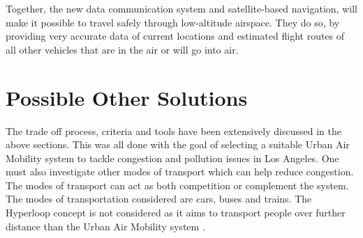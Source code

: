 Together, the new data communication system and satellite-based navigation, will make it possible to travel safely through low-altitude airspace. They do so, by providing very accurate data of current locations and estimated flight routes of all other vehicles that are in the air or will go into air. 

\section{Possible Other Solutions}
\label{comparisonmodesoftransport}
The trade off process, criteria and tools have been extensively discussed in the above sections. This was all done with the goal of selecting a suitable Urban Air Mobility system to tackle congestion and pollution issues in Los Angeles. One must also investigate other modes of transport which can help reduce congestion. The modes of transport can act as both competition or complement the system. The modes of transportation considered are cars, buses and trains. The Hyperloop concept is not considered as it aims to transport people over further distance than the Urban Air Mobility system \cite{hyperloopsucks}.
